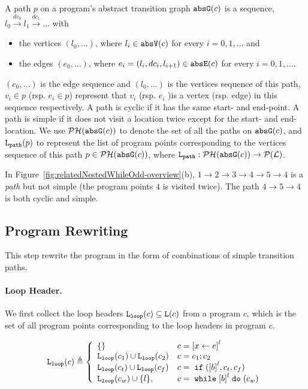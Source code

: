 \begin{defn}[Path]
 \label{def:abs_cfgpath} 
 A path $p$ on a program's abstract transition graph $\mathtt{abs}{\mathtt{G}}(c)$ is a sequence, $ l_0 \xrightarrow{dc_0} l_1 \xrightarrow{dc_1} \ldots $ with
 \begin{itemize}
 \item the vertices $(l_0, \ldots)$, where $l_i \in \mathtt{abs}{\mathtt{V}}(c)$ for every $i = 0, 1, \ldots$ and
 \item the edges $(e_0, \ldots)$, where $e_i = (l_{i}, dc_i, l_{i + 1}) \in \mathtt{abs}{\mathtt{E}}(c)$ for every $i = 0, 1, \ldots$.
 \end{itemize}
  $(e_0, \ldots)$ is the edge sequence and $(l_0, \ldots)$ is the vertices sequence
 of this path, $v_i \in p$ (rsp. $e_i \in p$) represent that $v_i$ (rsp. $e_i$ )is a vertex (rsp. edge) in this sequence respectively.
 A path is cyclic if it has the same start- and end-point. A path is simple if it does not visit a location twice except for the start- and end-location. We use $\mathcal{PH}(\mathtt{abs}{\mathtt{G}}(c))$ to denote the set of all the paths on $\mathtt{abs}{\mathtt{G}}(c)$,
 and $\mathtt{L}_{\mathtt{path}}(p)$ to represent the list of program points corresponding to the vertices sequence of this path $p \in \mathcal{PH}(\mathtt{abs}{\mathtt{G}}(c))$,
 where $\mathtt{L}_{\mathtt{path}}: \mathcal{PH}(\mathtt{abs}{\mathtt{G}}(c)) \to \mathcal{P}{(\mathcal{L})}$.
 \end{defn}
 In Figure~\ref{fig:relatedNestedWhileOdd-overview}(b), $1 \to 2 \to 3 \to 4 \to 5 \to 4$ is a \emph{path} but not simple (the program points $4$ is visited twice). The path $4 \to 5 \to 4$ is both cyclic and simple.


\subsection{Program Rewriting}
This step rewrite the program in the form of combinations of simple transition paths.



\paragraph{Loop Header.}
We first collect the loop headers $\mathtt{L}_{\mathtt{loop}}(c) \subseteq \mathtt{L}(c)$ from a program $c$, which is the set of all program points corresponding to the loop headers in program $c$.
\begin{defn}
  \label{def:loopl}
  \[
  \loopl(c) \triangleq 
  \left\{
    \begin{array}{ll}
      \{\}  & {c} = \clabel{\assign x e}^{l} \\
      \loopl({c_1}) \cup \loopl({{c_2}})  & {c} = {c_1};{c_2} \\
      \loopl(c_t) \cup \loopl({{c_f}})   & {c} =\eif(\clabel{\bexpr}^{l}, c_t, c_f) \\
  \loopl(c_w) \cup \{l\}, &  {c}   = \ewhile \clabel{\bexpr}^{l} \edo (c_w)
  \end{array}
\right.
\]
  \end{defn}

